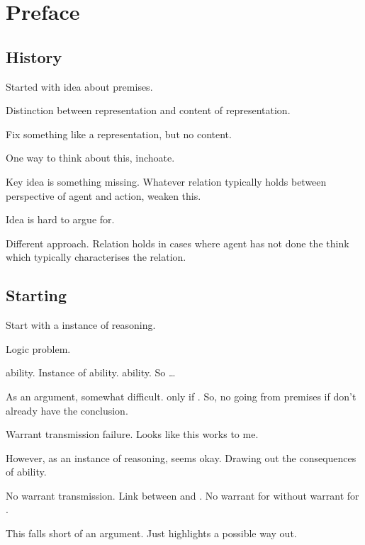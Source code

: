 \chapter{Preface}
\label{cha:introduction}

\section{History}

\begin{note}
  Started with idea about premises.

  Distinction between representation and content of representation.

  Fix something like a representation, but no content.

  One way to think about this, inchoate.
\end{note}

\begin{note}
  Key idea is something missing.
  Whatever relation typically holds between perspective of agent and action, weaken this.
\end{note}

\begin{note}
  Idea is hard to argue for.
\end{note}

\begin{note}
  Different approach.
  Relation holds in cases where agent has not done the think which typically characterises the relation.
\end{note}

\section{Starting}
\nocite{Brown:2004us}

\begin{note}
  Start with a instance of reasoning.

  Logic problem.

   ability.
  Instance of \abgen{} ability.
   ability.
  So \dots

  As an argument, somewhat difficult.
   only if \abgen{}.
  So, no going from premises if don't already have the conclusion.

  Warrant transmission failure.
  Looks like this works to me.

  However, as an instance of reasoning, seems okay.
  Drawing out the consequences of \abgen{} ability.

  No warrant transmission.
  Link between \abgen{} and \abspec{}.
  No warrant for \abgen{} without warrant for \abspec{}.

  This falls short of an argument.
  Just highlights a possible way out.
\end{note}

